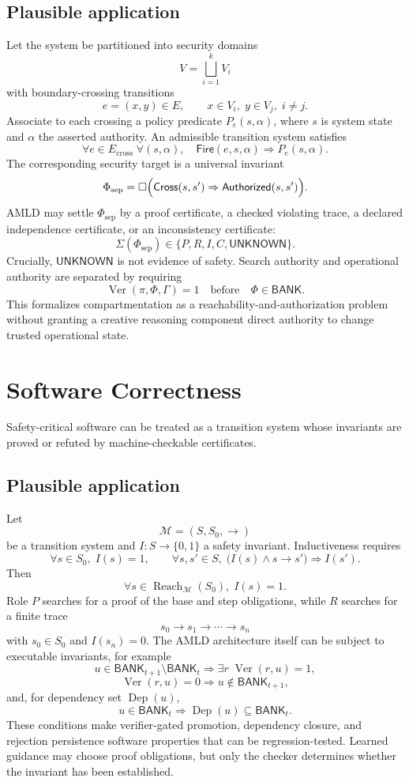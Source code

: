 \documentclass[11pt]{article}
\newcommand{\BANK}{\mathsf{BANK}}
\newcommand{\Reach}{\operatorname{Reach}}
\newcommand{\Ver}{\operatorname{Ver}}
\newcommand{\Dep}{\operatorname{Dep}}
\newcommand{\UNKNOWN}{\mathsf{UNKNOWN}}
\begin{document}
\subsection*{Plausible application}
Let the system be partitioned into security domains
\[
V=\bigsqcup_{i=1}^{k}V_i
\]
with boundary-crossing transitions
\[
e=(x,y)\in E,\qquad x\in V_i,\;y\in V_j,\;i\neq j.
\]
Associate to each crossing a policy predicate \(P_e(s,\alpha)\), where \(s\) is system state and
\(\alpha\) the asserted authority. An admissible transition system satisfies
\[
\forall e\in E_{\mathrm{cross}}\;\forall(s,\alpha),
\quad
\mathsf{Fire}(e,s,\alpha)\Rightarrow P_e(s,\alpha).
\]
The corresponding security target is a universal invariant
\[
\Phi_{\mathrm{sep}}
=
\Box\Bigl(
\mathsf{Cross}(s,s')
\Rightarrow
\mathsf{Authorized}(s,s')
\Bigr).
\]
AMLD may settle \(\Phi_{\mathrm{sep}}\) by a proof certificate, a checked violating trace, a declared
independence certificate, or an inconsistency certificate:
\[
\Sigma(\Phi_{\mathrm{sep}})
\in
\{P,R,I,C,\UNKNOWN\}.
\]
Crucially, \(\UNKNOWN\) is not evidence of safety. Search authority and operational authority are
separated by requiring
\[
\Ver(\pi,\Phi,\Gamma)=1
\quad\text{before}\quad
\Phi\in\BANK.
\]
This formalizes compartmentation as a reachability-and-authorization problem without granting a
creative reasoning component direct authority to change trusted operational state.

\section{Software Correctness}
Safety-critical software can be treated as a transition system whose invariants are proved or refuted by
machine-checkable certificates.

\subsection*{Plausible application}
Let
\[
\mathcal M=(S,S_0,\to)
\]
be a transition system and \(I:S\to\{0,1\}\) a safety invariant. Inductiveness requires
\[
\forall s\in S_0,\;I(s)=1,
\qquad
\forall s,s'\in S,\;
\bigl(I(s)\land s\to s'\bigr)\Rightarrow I(s').
\]
Then
\[
\forall s\in\Reach_{\mathcal M}(S_0),\;I(s)=1.
\]
Role \(P\) searches for a proof of the base and step obligations, while \(R\) searches for a finite
trace
\[
s_0\to s_1\to\cdots\to s_n
\]
with \(s_0\in S_0\) and \(I(s_n)=0\). The AMLD architecture itself can be subject to executable
invariants, for example
\[
u\in\BANK_{t+1}\setminus\BANK_t
\Longrightarrow
\exists r\;\Ver(r,u)=1,
\]
\[
\Ver(r,u)=0\Longrightarrow u\notin\BANK_{t+1},
\]
and, for dependency set \(\Dep(u)\),
\[
u\in\BANK_t\Longrightarrow \Dep(u)\subseteq\BANK_t.
\]
These conditions make verifier-gated promotion, dependency closure, and rejection persistence software
properties that can be regression-tested. Learned guidance may choose proof obligations, but only the
checker determines whether the invariant has been established.
\end{document}

